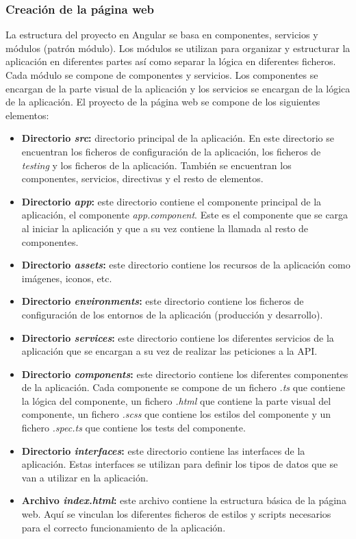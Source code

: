 \subsubsection{Creación de la página web}\label{subsubsec:creacion-de-la-pagina-web}

La estructura del proyecto en Angular se basa en componentes, servicios y módulos (patrón módulo). Los módulos se utilizan
para organizar y estructurar la aplicación en diferentes partes así como separar la lógica en diferentes ficheros. Cada módulo
se compone de componentes y servicios. Los componentes se encargan de la parte visual de la aplicación y los servicios
se encargan de la lógica de la aplicación. El proyecto de la página web se compone de los siguientes elementos:

\begin{itemize}
    \item \textbf{Directorio \textit{src}:} directorio principal de la aplicación. En este directorio se encuentran los ficheros
    de configuración de la aplicación, los ficheros de \textit{testing} y los ficheros de la aplicación. También se encuentran
    los componentes, servicios, directivas y el resto de elementos.
    \item \textbf{Directorio \textit{app}:} este directorio contiene el componente principal de la aplicación, el componente \textit{app.component}.
    Este es el componente que se carga al iniciar la aplicación y que a su vez contiene la llamada al resto de componentes.
    \item \textbf{Directorio \textit{assets}:} este directorio contiene los recursos de la aplicación como imágenes, iconos, etc.
    \item \textbf{Directorio \textit{environments}:} este directorio contiene los ficheros de configuración de los entornos de la aplicación (producción y desarrollo).
    \item \textbf{Directorio \textit{services}:} este directorio contiene los diferentes servicios de la aplicación que se encargan a su vez de realizar
    las peticiones a la API.
    \item \textbf{Directorio \textit{components}:} este directorio contiene los diferentes componentes de la aplicación. Cada componente se compone de un fichero
    \textit{.ts} que contiene la lógica del componente, un fichero \textit{.html} que contiene la parte visual del componente, un fichero \textit{.scss}
    que contiene los estilos del componente y un fichero \textit{.spec.ts} que contiene los tests del componente.
    \item \textbf{Directorio \textit{interfaces}:} este directorio contiene las interfaces de la aplicación. Estas interfaces se utilizan para definir
    los tipos de datos que se van a utilizar en la aplicación.
    \item \textbf{Archivo \textit{index.html}:} este archivo contiene la estructura básica de la página web. Aquí se vinculan los diferentes ficheros de estilos
    y scripts necesarios para el correcto funcionamiento de la aplicación.
\end{itemize}

